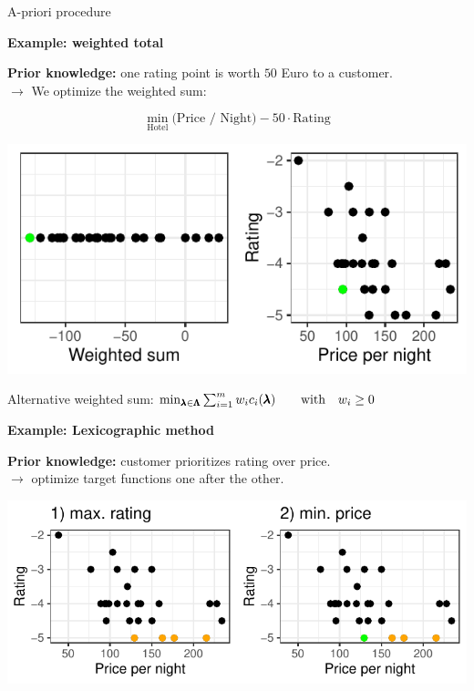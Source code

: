 \begin{frame}[allowframebreaks]{A-priori procedure}

\textbf{Example: weighted total}


\textbf{Prior knowledge:} one rating point is worth $50$ Euro to a customer. \\ $\to$ We optimize the weighted sum:

$$
\min_\text{Hotel} \text{(Price / Night)} - 50 \cdot \text{Rating}
$$

    \begin{center}
\includegraphics[scale=0.555555]{images/expedia-9-1}
    \end{center}

    Alternative weighted sum: $\min_{\pmb{\lambda} \in \pmb{\Lambda}} \sum_{i = 1}^m w_i c_i(\pmb{\lambda}) \qquad \text{with} \quad w_i \ge 0 $

\framebreak

\textbf{Example: Lexicographic method}

\textbf{Prior knowledge:} customer prioritizes rating over price. \\
$\to$ optimize target functions one after the other.


    \begin{center}
\includegraphics[scale=1]{images/expedia-10-1}
    \end{center}


\end{frame}
